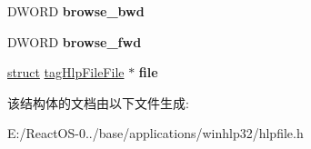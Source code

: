 \begin{DoxyCompactItemize}
\item 
\mbox{\label{structtag_hlp_file_page_abd8473bcf5e987d8cefd1b2f0c1b5029}} 
D\+W\+O\+RD {\bfseries browse\+\_\+bwd}
\item 
\mbox{\label{structtag_hlp_file_page_aeae38244596ace2848afec8637a9e242}} 
D\+W\+O\+RD {\bfseries browse\+\_\+fwd}
\item 
\mbox{\label{structtag_hlp_file_page_a435cff944f8bc17d28e694cd67b021a2}} 
\hyperlink{interfacestruct}{struct} \hyperlink{structtag_hlp_file_file}{tag\+Hlp\+File\+File} $\ast$ {\bfseries file}
\end{DoxyCompactItemize}


该结构体的文档由以下文件生成\+:\begin{DoxyCompactItemize}
\item 
E\+:/\+React\+O\+S-\/0../base/applications/winhlp32/hlpfile.\+h\end{DoxyCompactItemize}
